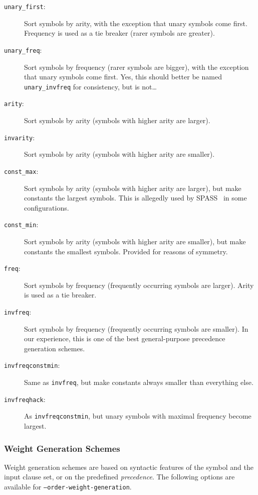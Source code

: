 \documentclass{report}
\begin{document}
\begin{description}
\item[\texttt{unary\_first}:] Sort symbols by arity, with the
  exception that unary symbols come first. Frequency is used as a
  tie breaker (rarer symbols are greater).
\item[\texttt{unary\_freq}:] Sort symbols by frequency (rarer symbols
  are bigger), with the exception that unary symbols come first. Yes,
  this should better be named \texttt{unary\_invfreq} for
  consistency, but is not\ldots
\item[\texttt{arity}:] Sort symbols by arity (symbols with higher
  arity are larger).
\item[\texttt{invarity}:] Sort symbols by arity (symbols with higher
  arity are smaller).
\item[\texttt{const\_max}:] Sort symbols by arity (symbols with higher
  arity are larger), but make constants the largest symbols. This is allegedly
  used by SPASS~\cite{Weidenbach:SPASS-2001} in some configurations.
\item[\texttt{const\_min}:] Sort symbols by arity (symbols with higher
  arity are smaller), but make constants the smallest symbols.
  Provided for reasons of symmetry.
\item[\texttt{freq}:] Sort symbols by frequency (frequently occurring
  symbols are larger). Arity is used as a tie breaker.
\item[\texttt{invfreq}:] Sort symbols by frequency (frequently occurring
  symbols are smaller). In our experience, this is one of the best
  general-purpose precedence generation schemes.
\item[\texttt{invfreqconstmin}:] Same as \texttt{invfreq}, but make
  constants always smaller than everything else.
\item[\texttt{invfreqhack}:] As \texttt{invfreqconstmin}, but unary
  symbols with maximal frequency become largest.
\end{description}


\subsubsection{Weight Generation Schemes}

Weight generation schemes are based on syntactic features of the
symbol and the input clause set, or on the predefined
\emph{precedence}. The following options are available for
\texttt{--order-weight-generation}.
\end{document}
